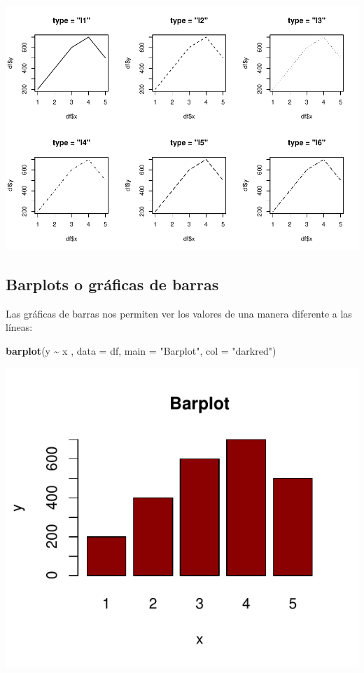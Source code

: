 \documentclass[
]{book}
\newenvironment{Shaded}{\begin{snugshade}}{\end{snugshade}}
\newcommand{\AttributeTok}[1]{\textcolor[rgb]{0.13,0.29,0.53}{#1}}
\newcommand{\FunctionTok}[1]{\textcolor[rgb]{0.13,0.29,0.53}{\textbf{#1}}}
\newcommand{\NormalTok}[1]{#1}
\newcommand{\SpecialCharTok}[1]{\textcolor[rgb]{0.81,0.36,0.00}{\textbf{#1}}}
\newcommand{\StringTok}[1]{\textcolor[rgb]{0.31,0.60,0.02}{#1}}
\begin{document}
\includegraphics{_main_files/figure-latex/unnamed-chunk-198-1.pdf}

\hfill\break
\hfill\break

\subsection{Barplots o gráficas de barras}\label{barplots-o-gruxe1ficas-de-barras}

\hfill\break
Las gráficas de barras nos permiten ver los valores de una manera diferente a las líneas:\\

\begin{Shaded}
\begin{Highlighting}[]
\FunctionTok{barplot}\NormalTok{(y }\SpecialCharTok{\textasciitilde{}}\NormalTok{ x , }\AttributeTok{data =}\NormalTok{ df, }\AttributeTok{main =} \StringTok{"Barplot"}\NormalTok{, }\AttributeTok{col =} \StringTok{"darkred"}\NormalTok{)}
\end{Highlighting}
\end{Shaded}

\begin{center}\includegraphics{_main_files/figure-latex/unnamed-chunk-199-1} \end{center}
\end{document}
